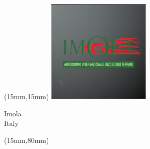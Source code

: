 \begin{textblock*}{50mm}(15mm,15mm)%
\includegraphics[width=50mm]{LG/2015-05-20_00083.png}
\par Imola\\ Italy
\end{textblock*}
\begin{textblock*}{185mm}(15mm,80mm)%
\end{textblock*}
